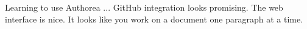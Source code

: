 Learning to use Authorea ... GitHub integration looks promising. The web interface is nice. It looks like you work on a document one paragraph at a time.